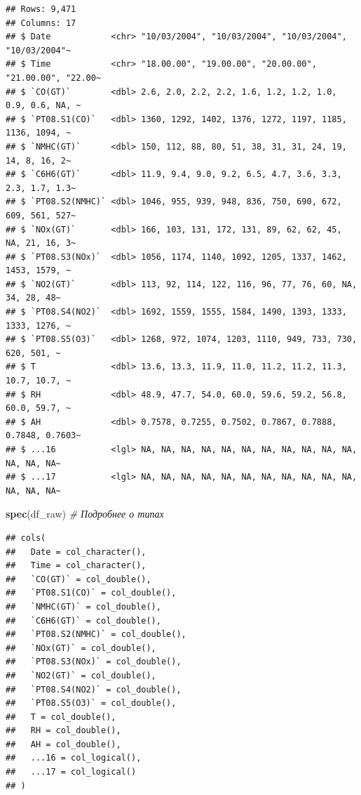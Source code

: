 \documentclass[
]{article}
\newenvironment{Shaded}{\begin{snugshade}}{\end{snugshade}}
\newcommand{\CommentTok}[1]{\textcolor[rgb]{0.56,0.35,0.01}{\textit{#1}}}
\newcommand{\FunctionTok}[1]{\textcolor[rgb]{0.13,0.29,0.53}{\textbf{#1}}}
\newcommand{\NormalTok}[1]{#1}
\begin{document}
\begin{verbatim}
## Rows: 9,471
## Columns: 17
## $ Date            <chr> "10/03/2004", "10/03/2004", "10/03/2004", "10/03/2004"~
## $ Time            <chr> "18.00.00", "19.00.00", "20.00.00", "21.00.00", "22.00~
## $ `CO(GT)`        <dbl> 2.6, 2.0, 2.2, 2.2, 1.6, 1.2, 1.2, 1.0, 0.9, 0.6, NA, ~
## $ `PT08.S1(CO)`   <dbl> 1360, 1292, 1402, 1376, 1272, 1197, 1185, 1136, 1094, ~
## $ `NMHC(GT)`      <dbl> 150, 112, 88, 80, 51, 38, 31, 31, 24, 19, 14, 8, 16, 2~
## $ `C6H6(GT)`      <dbl> 11.9, 9.4, 9.0, 9.2, 6.5, 4.7, 3.6, 3.3, 2.3, 1.7, 1.3~
## $ `PT08.S2(NMHC)` <dbl> 1046, 955, 939, 948, 836, 750, 690, 672, 609, 561, 527~
## $ `NOx(GT)`       <dbl> 166, 103, 131, 172, 131, 89, 62, 62, 45, NA, 21, 16, 3~
## $ `PT08.S3(NOx)`  <dbl> 1056, 1174, 1140, 1092, 1205, 1337, 1462, 1453, 1579, ~
## $ `NO2(GT)`       <dbl> 113, 92, 114, 122, 116, 96, 77, 76, 60, NA, 34, 28, 48~
## $ `PT08.S4(NO2)`  <dbl> 1692, 1559, 1555, 1584, 1490, 1393, 1333, 1333, 1276, ~
## $ `PT08.S5(O3)`   <dbl> 1268, 972, 1074, 1203, 1110, 949, 733, 730, 620, 501, ~
## $ T               <dbl> 13.6, 13.3, 11.9, 11.0, 11.2, 11.2, 11.3, 10.7, 10.7, ~
## $ RH              <dbl> 48.9, 47.7, 54.0, 60.0, 59.6, 59.2, 56.8, 60.0, 59.7, ~
## $ AH              <dbl> 0.7578, 0.7255, 0.7502, 0.7867, 0.7888, 0.7848, 0.7603~
## $ ...16           <lgl> NA, NA, NA, NA, NA, NA, NA, NA, NA, NA, NA, NA, NA, NA~
## $ ...17           <lgl> NA, NA, NA, NA, NA, NA, NA, NA, NA, NA, NA, NA, NA, NA~
\end{verbatim}

\begin{Shaded}
\begin{Highlighting}[]
\FunctionTok{spec}\NormalTok{(df\_raw) }\CommentTok{\# Подробнее о типах}
\end{Highlighting}
\end{Shaded}

\begin{verbatim}
## cols(
##   Date = col_character(),
##   Time = col_character(),
##   `CO(GT)` = col_double(),
##   `PT08.S1(CO)` = col_double(),
##   `NMHC(GT)` = col_double(),
##   `C6H6(GT)` = col_double(),
##   `PT08.S2(NMHC)` = col_double(),
##   `NOx(GT)` = col_double(),
##   `PT08.S3(NOx)` = col_double(),
##   `NO2(GT)` = col_double(),
##   `PT08.S4(NO2)` = col_double(),
##   `PT08.S5(O3)` = col_double(),
##   T = col_double(),
##   RH = col_double(),
##   AH = col_double(),
##   ...16 = col_logical(),
##   ...17 = col_logical()
## )
\end{verbatim}
\end{document}
